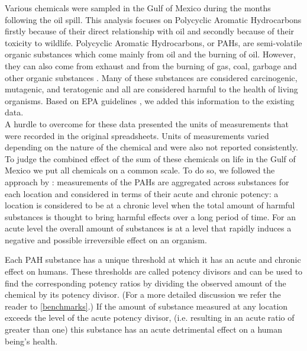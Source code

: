 \documentclass[authoryear,12pt]{elsarticle}
\begin{document}
Various chemicals were sampled in the Gulf of Mexico during the months following the oil spill. This analysis focuses on Polycyclic Aromatic Hydrocarbons firstly because of their direct relationship with oil and secondly because of their toxicity to wildlife. Polycyclic Aromatic Hydrocarbons, or PAHs, are semi-volatile organic substances which come mainly from oil and the burning of oil. However, they can also come from exhaust and from the burning of gas, coal, garbage and other organic substances \citep{pah}.   Many of these substances are considered carcinogenic, mutagenic, and teratogenic and all are considered harmful to the health of living organisms. Based on EPA guidelines \citep{pah},  {we added} this information to the  {existing} data. \\
{A hurdle to overcome for these data presented the units of measurements that were recorded in the original spreadsheets. Units of measurements varied depending on the nature of the chemical and were also not reported consistently. To judge the combined effect of the sum of these chemicals on life in the Gulf of Mexico we put all chemicals on a common scale.}
 {To do so,} we followed the approach by \citet{pah-benchmark}: measurements of the PAHs are aggregated across substances for each location and considered in terms of their acute and chronic potency: a location is considered to be  at a chronic level when the total amount of harmful substances is thought to bring harmful effects over a long period of time. For an acute level the overall amount of substances is at a level that rapidly induces a negative and possible irreversible effect  {on} an organism. 
 
Each PAH substance has a unique threshold at which it has an acute  {and} chronic effect on humans. These thresholds are called potency divisors  {and can be used} to find  {the} corresponding potency ratios by dividing the observed amount {of the chemical} by its  {potency} divisor. (For a more detailed discussion  {we refer the reader to}  \ref{benchmarks}.) {If the amount of substance measured at any location exceeds the level of the acute potency divisor, (i.e. resulting in an acute ratio of greater than one) this substance has an acute detrimental effect on a human being's health.} %
\end{document}
